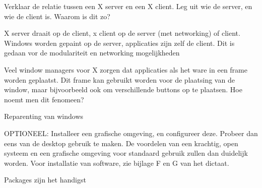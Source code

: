 \question[10] Verklaar de relatie tussen een X server en een X client. Leg uit wie de server, en wie de client is. Waarom is dit zo?
\begin{solution}

X server draait op de client, x client op de server (met networking) of client. Windows worden gepaint op de server, applicaties zijn zelf de client. Dit is gedaan vor de modulariteit en networking mogelijkheden
\end{solution}
\question[10] Veel window managers voor X zorgen dat applicaties als het ware in een frame worden geplaatst. Dit frame kan gebruikt worden voor de plaatsing van de window, maar bijvoorbeeld ook om verschillende buttons op te plaatsen. Hoe noemt men dit fenomeen?
\begin{solution}

Reparenting van windows
\end{solution}

\question[10] OPTIONEEL: Installeer een grafische omgeving, en configureer deze. Probeer dan eens van de desktop gebruik te maken. De voordelen van een krachtig, open systeem en een grafische omgeving voor standaard gebruik zullen dan duidelijk worden. Voor installatie van software, zie bijlage F en G van het dictaat.
\begin{solution}
Packages zijn het handigst
\end{solution}
